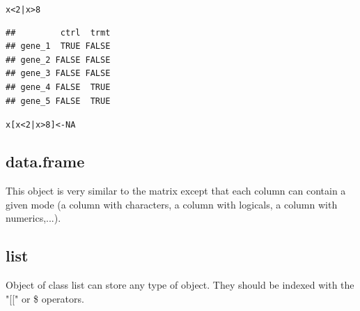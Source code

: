 \documentclass[10pt]{article}\usepackage[]{graphicx}\usepackage[]{color}
\makeatletter
\newcommand{\hlnum}[1]{\textcolor[rgb]{0.686,0.059,0.569}{#1}}%
\newcommand{\hlopt}[1]{\textcolor[rgb]{0,0,0}{#1}}%
\newcommand{\hlstd}[1]{\textcolor[rgb]{0.345,0.345,0.345}{#1}}%
\newcommand{\hlkwb}[1]{\textcolor[rgb]{0.69,0.353,0.396}{#1}}%
\newenvironment{kframe}{%
 \def\at@end@of@kframe{}%
 \ifinner\ifhmode%
  \def\at@end@of@kframe{\end{minipage}}%
  \begin{minipage}{\columnwidth}%
 \fi\fi%
 \def\FrameCommand##1{\hskip\@totalleftmargin \hskip-\fboxsep
 \colorbox{shadecolor}{##1}\hskip-\fboxsep
     \hskip-\linewidth \hskip-\@totalleftmargin \hskip\columnwidth}%
 \MakeFramed {\advance\hsize-\width
   \@totalleftmargin\z@ \linewidth\hsize
   \@setminipage}}%
 {\par\unskip\endMakeFramed%
 \at@end@of@kframe}
\newenvironment{knitrout}{}{} %
\makeatother
\begin{document}
\begin{knitrout}
\color{fgcolor}\begin{kframe}
\begin{alltt}
\hlstd{x} \hlopt{<} \hlnum{2} \hlopt{|} \hlstd{x} \hlopt{>} \hlnum{8}
\end{alltt}
\begin{verbatim}
##         ctrl  trmt
## gene_1  TRUE FALSE
## gene_2 FALSE FALSE
## gene_3 FALSE FALSE
## gene_4 FALSE  TRUE
## gene_5 FALSE  TRUE
\end{verbatim}
\begin{alltt}
\hlstd{x[x} \hlopt{<} \hlnum{2} \hlopt{|} \hlstd{x} \hlopt{>} \hlnum{8}\hlstd{]} \hlkwb{<-}  \hlnum{NA}
\end{alltt}
\end{kframe}
\end{knitrout}


\subsection{data.frame}
This object is very similar to the matrix except that each column can contain a given mode (a column with characters, a column with logicals, a column with numerics,...).

\subsection{list}
Object of class list can store any type of object. They should be indexed with the "[[" or \$ operators.
\end{document}
